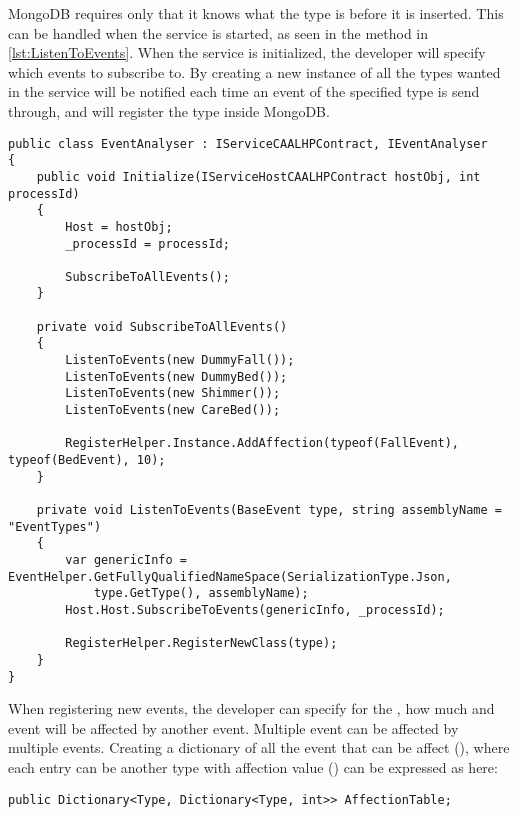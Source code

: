 MongoDB requires only that it knows what the type is before it is inserted.
This can be handled when the service is started, as seen in the method  in \codeTitle \ref{lst:ListenToEvents}.
When the service is initialized, the developer will specify which events to subscribe to.
By creating a new instance of all the types wanted in  the service will be notified each time an event of the specified type is send through, and will register the type inside MongoDB.

\begin{lstlisting}[caption=Registering classes from the EventAnalyzer, style=Code-C++, label=lst:ListenToEvents]
public class EventAnalyser : IServiceCAALHPContract, IEventAnalyser
{
	public void Initialize(IServiceHostCAALHPContract hostObj, int processId)
	{
		Host = hostObj;
		_processId = processId;

		SubscribeToAllEvents();
	}

	private void SubscribeToAllEvents()
	{
		ListenToEvents(new DummyFall());
		ListenToEvents(new DummyBed());
		ListenToEvents(new Shimmer());
		ListenToEvents(new CareBed());

		RegisterHelper.Instance.AddAffection(typeof(FallEvent), typeof(BedEvent), 10);
	}

	private void ListenToEvents(BaseEvent type, string assemblyName = "EventTypes")
	{
		var genericInfo = EventHelper.GetFullyQualifiedNameSpace(SerializationType.Json,
			type.GetType(), assemblyName);
		Host.Host.SubscribeToEvents(genericInfo, _processId);

		RegisterHelper.RegisterNewClass(type);
	}
}
\end{lstlisting}

When registering new events, the developer can specify for the , how much and event will be affected by another event.
Multiple event can be affected by multiple events.
Creating a dictionary of all the event that can be affect (), where each entry can be another type with affection value () can be expressed as here:

\begin{lstlisting}[style=Code-C++]
public Dictionary<Type, Dictionary<Type, int>> AffectionTable;
\end{lstlisting}

